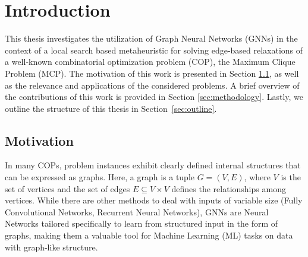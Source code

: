 \documentclass[draft,final]{vutinfth} %
\begin{document}
\frontmatter %

\addstatementpage

\begin{danksagung*}
\end{danksagung*}

\begin{acknowledgements*}
\end{acknowledgements*}

\begin{kurzfassung}
\end{kurzfassung}

\begin{abstract}
\end{abstract}


\tableofcontents %

\mainmatter

\chapter{Introduction}

This thesis investigates the utilization of Graph Neural Networks (GNNs) in the context of a local search based metaheuristic for solving edge-based relaxations of a well-known combinatorial optimization problem (COP), the Maximum Clique Problem (MCP).
The motivation of this work is presented in Section \ref{sec:motivation}, as well as the relevance and applications of the considered problems. A brief overview of the contributions of this work is provided in Section \ref{sec:methodology}. Lastly, we outline the structure of this thesis in Section~\ref{sec:outline}.

\section{Motivation}\label{sec:motivation}
In many COPs, problem instances exhibit clearly defined internal structures that can be expressed as graphs. Here, a graph is a tuple $G = (V, E)$, where $V$ is the set of vertices and the set of edges $E \subseteq V \times V$ defines the relationships among vertices. While there are other methods to deal with inputs of variable size (Fully Convolutional Networks, Recurrent Neural Networks), GNNs are Neural Networks tailored specifically to learn from structured input in the form of graphs, making them a valuable tool for Machine Learning (ML) tasks on data with graph-like structure.   
\end{document}
